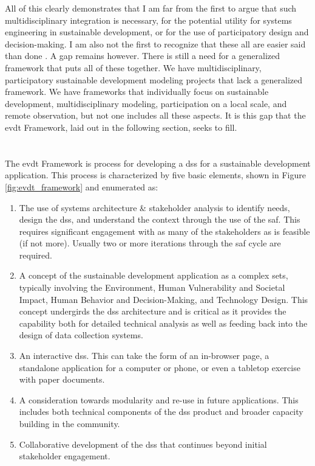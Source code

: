 All of this clearly demonstrates that I am far from the first to argue that such multidisciplinary integration is necessary, for the potential utility for systems engineering in sustainable development, or for the use of participatory design and decision-making. I am also not the first to recognize that these all are easier said than done \cite{shahumyanIntegrationLandUse2017}. A gap remains however. There is still a need for a generalized framework that puts all of these together. We have multidisciplinary, participatory sustainable development modeling projects that lack a generalized framework. We have frameworks that individually focus on sustainable development, multidisciplinary modeling, participation on a local scale, and remote observation, but not one includes all these aspects. It is this gap that the \ac{evdt} Framework, laid out in the following section, seeks to fill.

\section{} \label{sec:framework}

The \ac{evdt} Framework is process for developing a \ac{dss} for a sustainable development application. This process is characterized by five basic elements, shown in Figure \ref{fig:evdt_framework} and enumerated as: 

\begin{enumerate}[label=\emph{\Alph*)},itemsep=0pt,parsep=0pt]
	\item{The use of systems architecture \& stakeholder analysis to identify needs, design the \ac{dss}, and understand the context through the use of the \acf{saf}. This requires significant engagement with as many of the stakeholders as is feasible (if not more). Usually two or more iterations through the \ac{saf} cycle are required.}
	\item{A concept of the sustainable development application as a complex \ac{sets}, typically involving the Environment, Human Vulnerability and Societal Impact, Human Behavior and Decision-Making, and Technology Design. This concept undergirds the \ac{dss} architecture and is critical as it provides the capability both for detailed technical analysis as well as feeding back into the design of data collection systems. \label{item:evdt}}
	\item{An interactive \ac{dss}. This can take the form of an in-browser page, a standalone application for a computer or phone, or even a tabletop exercise with paper documents.}
	\item{A consideration towards modularity and re-use in future applications. This includes both technical components of the \ac{dss} product and broader capacity building in the community.}
	\item{Collaborative development of the \ac{dss} that continues beyond initial stakeholder engagement.}
\end{enumerate}

